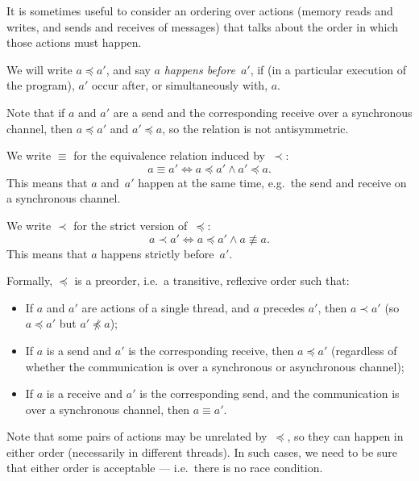 

It is sometimes useful to consider an ordering over actions (memory reads and
writes, and sends and receives of messages) that talks about the order in
which those actions must happen.

We will write $a \preceq a'$, and say $a$ \emph{happens before}~$a'$, if (in a
particular execution of the program), $a'$ occur after, or simultaneously
with, $a$.

Note that if $a$ and $a'$ are a send and the corresponding receive over a
synchronous channel, then $a \preceq a'$ and $a' \preceq a$, so the relation
is not antisymmetric. 



We write $\equiv$ for the equivalence relation induced by~$\prec$:
\[
a \equiv a' \iff a \preceq a' \land a' \preceq a.
\]
This means that $a$ and~$a'$ happen at the same time, e.g.~the send and
receive on a synchronous channel.

We write $\prec$ for the strict version of~$\preceq$:
\[
a \prec a' \iff a \preceq a' \land a \not\equiv a.
\]
This means that $a$ happens strictly before~$a'$.

Formally, $\preceq$ is a preorder, i.e.~a transitive, reflexive order such
that:
%
\begin{itemize}
\item
If $a$ and $a'$ are actions of a single thread, and $a$ precedes $a'$, then $a
\prec a'$ (so $a \preceq a'$ but $a' \not\preceq a$);

\item
If $a$ is a send and $a'$ is the corresponding receive, then $a \preceq a'$
(regardless of whether the communication is over a synchronous or asynchronous
channel);  

\item
If $a$ is a receive and $a'$ is the corresponding send, and the communication
is over a synchronous channel, then $a \equiv a'$.
\end{itemize}

Note that some pairs of actions may be unrelated by~$\preceq$, so they can
happen in either order (necessarily in different threads).  In such cases, we
need to be sure that either order is acceptable --- i.e.~there is no race
condition. 


